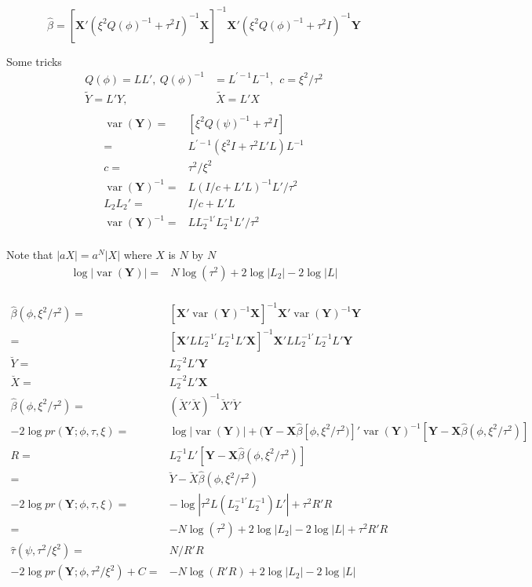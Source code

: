 \documentclass[12pt]{article}
\DeclareMathOperator{\var}{var}
\begin{document}
\[
\hat\beta = [ \mathbf{X}'
(  \xi^2  Q(\phi)^{-1} + \tau^2 I )^{-1}   \mathbf{X}]^{-1}
\mathbf{X}'(\xi^2  Q(\phi)^{-1} +
\tau^2 I  )^{-1} \mathbf{Y}
\]

Some tricks
\begin{align*}
 Q(\phi) = L L',\   Q(\phi)^{-1} &=L^{\prime-1} L^{-1}, \ \  c = \xi^2/\tau^2 \\
\tilde Y = L' Y,&  \  \tilde X = L' X\\
\end{align*}
\begin{align*}
\var(\mathbf{Y}) =&  [ \xi^2 Q(\psi)^{-1} +  \tau^2 I] \\
= &    L^{\prime -1}(  \xi^2I +   \tau^2 L'L  ) L^{-1}\\
c = & \tau^2/\xi^2\\
\var(\mathbf{Y})^{-1} = &    L(   I/c +   L'L   )^{-1} L' / \tau^2\\
L_2 L_2' = & I/c +    L'L \\
\var(\mathbf{Y})^{-1} = &    L L_2^{-1\prime} L_2^{-1} L' / \tau^2\\
\end{align*}


Note that $|aX| = a^N|X|$ where $X$ is $N$ by $N$
\begin{align*}
\log |\var(\mathbf{Y})| = & N \log(\tau^2) + 2 \log |L_2| - 2 \log |L|\\
\end{align*}



 
\begin{align*}
\hat\beta(\phi, \xi^2/\tau^2) = &[ \mathbf{X}' 
\var(\mathbf{Y})^{-1}  \mathbf{X}]^{-1}  
\mathbf{X}'\var(\mathbf{Y})^{-1} \mathbf{Y}\\
 = &[ \mathbf{X}' 
  L  L_2^{-1\prime} L_2^{-1}  L'    \mathbf{X}]^{-1}  
\mathbf{X}' L  L_2^{-1\prime} L_2^{-1}   L' \mathbf{Y}
\\
\breve Y =& L_2^{-2} L'  \mathbf{Y}\\
\breve X =& L_2^{-2} L' \mathbf{X}\\
\hat\beta(\phi, \xi^2/\tau^2) = & (\breve X' \breve X)^{-1} \breve X' \breve Y
\\
-2 \log pr(\mathbf{Y};\phi,\tau, \xi) = &
\log |\var(\mathbf{Y})| + ( \mathbf{Y} -\mathbf{X}\hat\beta[\phi, \xi^2/\tau^2) ]  '   
  \var(\mathbf{Y}) ^{-1} 
[\mathbf{Y} - \mathbf{X}\hat\beta(\phi, \xi^2/\tau^2) ] \\
R = & L_2^{-1}   L' [\mathbf{Y} - \mathbf{X}\hat\beta(\phi, \xi^2/\tau^2) ] \\
= & \breve Y - \breve X \hat\beta(\phi, \xi^2/\tau^2) \\
-2 \log pr(\mathbf{Y};\phi,\tau, \xi)  = &  - \log|  \tau^2  L(
L_2^{-1\prime} L_2^{-1} ) L'| +  \tau^2 R'R\\
= & - N \log(\tau^2) + 2\log|L_2| - 2\log|L| +  \tau^2 R'R\\
\hat\tau(\psi, \tau^2/\xi^2) = &  N/R'R \\
-2 \log pr(\mathbf{Y};\phi,\tau^2/\xi^2)+C = & - N \log (R'R)   + 2\log|L_2| -
2\log|L| 
\end{align*}
\end{document}

